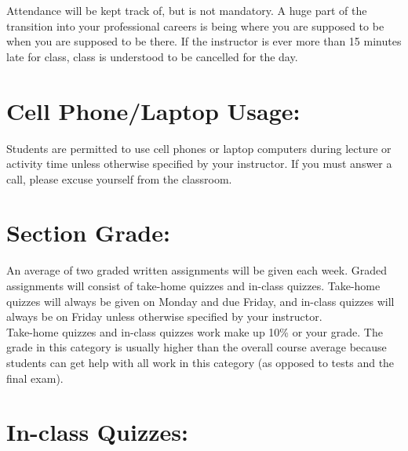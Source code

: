 \documentclass[paper=a4, fontsize=11pt]{scrartcl} %
\numberwithin{equation}{section} %
\numberwithin{figure}{section} %
\numberwithin{table}{section} %
\begin{document}
Attendance will be kept track of, but is not mandatory. A huge part of the transition into your professional careers is being where you are supposed to be when you are supposed to be there. If the instructor is ever more than 15 minutes late for class, class is understood to be cancelled for the day.


\section*{\textbf{Cell Phone/Laptop Usage:}}

Students are permitted to use cell phones or laptop computers during lecture or activity time unless otherwise specified by your instructor. If you must answer a call, please excuse yourself from the classroom.


\section*{\textbf{Section Grade:}}

An average of two graded written assignments will be given each week. Graded assignments will consist of take-home quizzes and in-class quizzes. Take-home quizzes will always be given on Monday and due Friday, and in-class quizzes will always be on Friday unless otherwise specified by your instructor.\\

Take-home quizzes and in-class quizzes work make up 10\% or your grade. The grade in this category is usually higher than the overall course average because students can get help with all work in this category (as opposed to tests and the final exam).


\section*{\textbf{In-class Quizzes:}}
\end{document}
